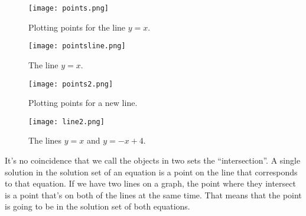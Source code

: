 
\begin{figure}[ht] 
  \label{ fig7} 
  \begin{minipage}[b]{0.5\linewidth}
    \centering
    \texttt{[image: points.png]} 
    \caption{Plotting points for the line $y=x$.} 
    \vspace{4ex}
  \end{minipage}%
  \begin{minipage}[b]{0.5\linewidth}
    \centering
    \texttt{[image: pointsline.png]} 
    \caption{The line $y=x$.} 
    \vspace{4ex}
  \end{minipage} 
  \begin{minipage}[b]{0.5\linewidth}
    \centering
    \texttt{[image: points2.png]} 
    \caption{Plotting points for a new line.} 
    \vspace{4ex}
  \end{minipage}%
  \begin{minipage}[b]{0.5\linewidth}
    \centering
    \texttt{[image: line2.png]} 
    \caption{The lines $y=x$ and $y=-x+4$.} 
    \vspace{4ex}
  \end{minipage} 
\end{figure}


It's no coincidence that we call the objects in two sets the ``intersection''.  A single solution in the solution set of an equation is a point on the line that corresponds to that equation.  If we have two lines on a graph, the point where they intersect is a point that's on both of the lines at the same time.  That means that the point is going to be in the solution set of both equations.

